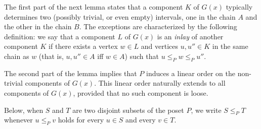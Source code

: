 \documentclass{article} \usepackage{fullpage}
\begin{document}
The first part of the next lemma states that a component $K$ of $G(x)$ typically determines two (possibly trivial, or even empty) intervals, one in the chain $A$ and the other in the chain $B$. The exceptions are characterized by the following definition: we say that a component $L$ of $G(x)$ is an {\sl inlay\/} of another component $K$ if there exists a vertex $w \in L$ and vertices $u, u'' \in K$ in the same chain as $w$ (that is, $u, u'' \in A$ iff $w \in A$) such that $u \leqslant_P w \leqslant_P u''$. 

The second part of the lemma implies that $P$ induces a linear order on the non-trivial components of $G(x)$. This linear order naturally extends to all components of $G(x)$, provided that no such component is loose. 

Below, when $S$ and $T$ are two disjoint subsets of the poset $P$, we write $S \leqslant_P T$ whenever $u \leqslant_P v$ holds for every $u \in S$ and every $v \in T$.
\end{document}

